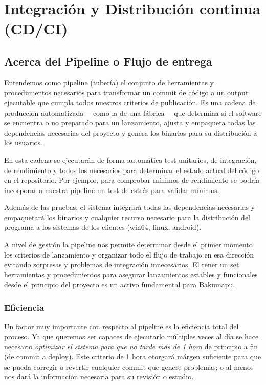 
\section{Integración y Distribución continua (CD/CI)}\label{pipeline:entrega-continua}

\subsection{Acerca del Pipeline o Flujo de entrega}\label{pipeline:acerca-del-pipeline}

Entendemos como pipeline (tubería) el conjunto de herramientas y procedimientos necesarios para transformar un commit de código a un output ejecutable que cumpla todos nuestros criterios de publicación. Es una cadena de producción automatizada ---como la de una fábrica--- que determina si el software se encuentra o no preparado para un lanzamiento, ajusta y empaqueta todas las dependencias necesarias del proyecto y genera los binarios para su distribución a los usuarios.

En esta cadena se ejecutarán de forma automática test unitarios, de integración, de rendimiento y todos los necesarios para determinar el estado actual del código en el repositorio. Por ejemplo, para comprobar mínimos de rendimiento se podría incorporar a nuestra pipeline un test de estrés para validar  mínimos.

Además de las pruebas, el sistema integrará todas las dependencias necesarias y empaquetará los binarios y cualquier recurso necesario para la distribución del programa a los sistemas de los clientes (win64, linux, android).

A nivel de gestión la pipeline nos permite determinar desde el primer momento los criterios de lanzamiento y organizar todo el flujo de trabajo en esa dirección evitando sorpresas y problemas de integración innecesarios. El tener un set herramientas y procedimientos para asegurar lanzamientos estables y funcionales desde el principio del proyecto es un activo fundamental para Bakumapu.

\subsubsection{Eficiencia}\label{pipeline:eficiencia}

Un factor muy importante con respecto al pipeline es la eficiencia total del proceso. Ya que queremos ser capaces de ejecutarlo múltiples veces al día se hace necesario \emph{optimizar el sistema para que no tarde más de 1 hora} de principio a fin (de commit a deploy). Este criterio de 1 hora otorgará márgen suficiente para que se pueda corregir o revertir cualquier commit que genere problemas; o al menos nos dará la información necesaria para su revisión o estudio.

